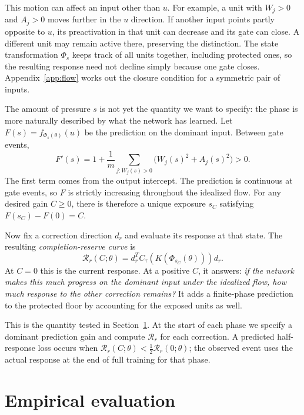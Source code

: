 \documentclass[11pt,a4paper]{article}
\begin{document}
This motion can affect an input other than $u$. For example, a unit with $W_j>0$ and $A_j>0$ moves further in the $u$ direction. If another input points partly opposite to $u$, its preactivation in that unit can decrease and its gate can close. A different unit may remain active there, preserving the distinction. The state transformation $\Phi_s$ keeps track of all units together, including protected ones, so the resulting response need not decline simply because one gate closes. Appendix~\ref{app:flow} works out the closure condition for a symmetric pair of inputs.

The amount of pressure $s$ is not yet the quantity we want to specify: the phase is more naturally described by what the network has learned. Let $F(s)=f_{\Phi_s(\theta)}(u)$ be the prediction on the dominant input. Between gate events,
\begin{equation}
 F'(s)=1+\frac1m\sum_{j:W_j(s)>0}\bigl(W_j(s)^2+A_j(s)^2\bigr)>0.
 \label{eq:gain}
\end{equation}
The first term comes from the output intercept. The prediction is continuous at gate events, so $F$ is strictly increasing throughout the idealized flow. For any desired gain $C\ge0$, there is therefore a unique exposure $s_C$ satisfying $F(s_C)-F(0)=C$.

Now fix a correction direction $d_r$ and evaluate its response at that state. The resulting \emph{completion-reserve curve} is
\begin{equation}
 \mathcal R_r(C;\theta)=d_r^TC_\tau\!\left(K(\Phi_{s_C}(\theta))\right)d_r.
 \label{eq:completion}
\end{equation}
At $C=0$ this is the current response. At a positive $C$, it answers: \emph{if the network makes this much progress on the dominant input under the idealized flow, how much response to the other correction remains?} It adds a finite-phase prediction to the protected floor by accounting for the exposed units as well.

This is the quantity tested in Section~\ref{sec:results}. At the start of each phase we specify a dominant prediction gain and compute $\mathcal R_r$ for each correction. A predicted half-response loss occurs when $\mathcal R_r(C;\theta)<\tfrac12\mathcal R_r(0;\theta)$; the observed event uses the actual response at the end of full training for that phase.

\section{Empirical evaluation}
\label{sec:results}
\end{document}
